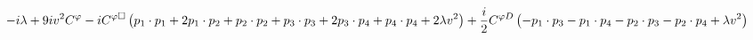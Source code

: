 %
\begin{dmath*}
%
  -  i \lambda   +  9 i v^2C^{\varphi }  -  iC^{ \varphi  \Box} \left(p_{1}\nobreak\cdot\nobreak{}p_{1} + 2 p_{1}\nobreak\cdot\nobreak{}p_{2} + p_{2}\nobreak\cdot\nobreak{}p_{2} + p_{3}\nobreak\cdot\nobreak{}p_{3} + 2 p_{3}\nobreak\cdot\nobreak{}p_{4} + p_{4}\nobreak\cdot\nobreak{}p_{4} + 2 \lambda v^2\right)  +  \frac{i}{2}C^{ \varphi  D} \left( - p_{1}\nobreak\cdot\nobreak{}p_{3} - p_{1}\nobreak\cdot\nobreak{}p_{4} - p_{2}\nobreak\cdot\nobreak{}p_{3} - p_{2}\nobreak\cdot\nobreak{}p_{4} + \lambda v^2\right)
%
\end{dmath*}
%
